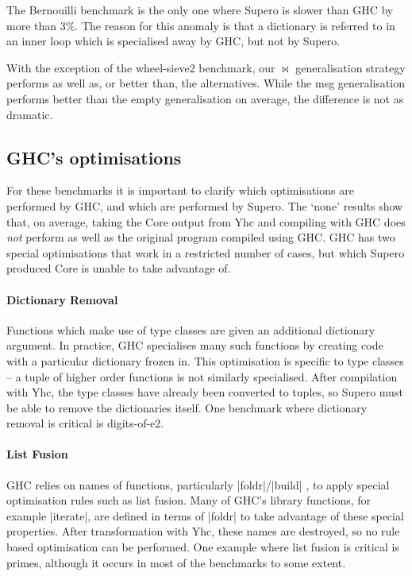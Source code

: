 The Bernouilli benchmark is the only one where Supero is slower than GHC by more than 3\%. The reason for this anomaly is that a dictionary is referred to in an inner loop which is specialised away by GHC, but not by Supero.

With the exception of the wheel-sieve2 benchmark, our $\bowtie$ generalisation strategy performs as well as, or better than, the alternatives. While the msg generalisation performs better than the empty generalisation on average, the difference is not as dramatic.

\subsection{GHC's optimisations}

For these benchmarks it is important to clarify which optimisations are performed by GHC, and which are performed by Supero. The `none' results show that, on average, taking the Core output from Yhc and compiling with GHC does \textit{not} perform as well as the original program compiled using GHC. GHC has two special optimisations that work in a restricted number of cases, but which Supero produced Core is unable to take advantage of.

\paragraph{Dictionary Removal} Functions which make use of type classes are given an additional dictionary argument. In practice, GHC specialises many such functions by creating code with a particular dictionary frozen in. This optimisation is specific to type classes -- a tuple of higher order functions is not similarly specialised. After compilation with Yhc, the type classes have already been converted to tuples, so Supero must be able to remove the dictionaries itself. One benchmark where dictionary removal is critical is digits-of-e2.

\paragraph{List Fusion} GHC relies on names of functions, particularly |foldr|/|build| \cite{spj:rules}, to apply special optimisation rules such as list fusion. Many of GHC's library functions, for example |iterate|, are defined in terms of |foldr| to take advantage of these special properties. After transformation with Yhc, these names are destroyed, so no rule based optimisation can be performed. One example where list fusion is critical is primes, although it occurs in most of the benchmarks to some extent.

